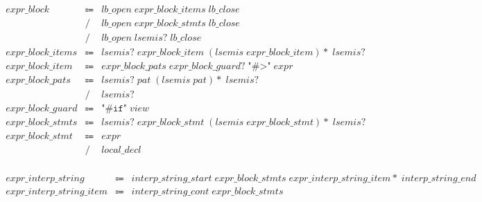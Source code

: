 \begin{align*}
    \begin{array}{rcll}
        \mathit{expr\_block}
        &\Coloneq &\mathit{lb\_open}\; \mathit{expr\_block\_items}\; \mathit{lb\_close} \\
        &\mathrel{/} &\mathit{lb\_open}\; \mathit{expr\_block\_stmts}\; \mathit{lb\_close} \\
        &\mathrel{/} &\mathit{lb\_open}\; \mathit{lsemis}{?}\; \mathit{lb\_close} \\
        \mathit{expr\_block\_items}
        &\Coloneq &\mathit{lsemis}{?}\; \mathit{expr\_block\_item}\; (\mathit{lsemis}\; \mathit{expr\_block\_item}){*}\; \mathit{lsemis}{?} \\
        \mathit{expr\_block\_item}
        &\Coloneq &\mathit{expr\_block\_pats}\; \mathit{expr\_block\_guard}{?}\; \texttt{"\#>"}\; \mathit{expr} \\
        \mathit{expr\_block\_pats}
        &\Coloneq &\mathit{lsemis}{?}\; \mathit{pat}\; (\mathit{lsemis}\; \mathit{pat}){*}\; \mathit{lsemis}{?} \\
        &\mathrel{/} &\mathit{lsemis}{?} \\
        \mathit{expr\_block\_guard}
        &\Coloneq &\texttt{"\#if"}\; \mathit{view} \\
        \mathit{expr\_block\_stmts}
        &\Coloneq &\mathit{lsemis}{?}\; \mathit{expr\_block\_stmt}\; (\mathit{lsemis}\; \mathit{expr\_block\_stmt}){*}\; \mathit{lsemis}{?} \\
        \mathit{expr\_block\_stmt}
        &\Coloneq &\mathit{expr} \\
        &\mathrel{/} &\mathit{local\_decl}
    \end{array}
\end{align*}

\begin{align*}
    \begin{array}{rcll}
        \mathit{expr\_interp\_string}
        &\Coloneq &\mathit{interp\_string\_start}\; \mathit{expr\_block\_stmts}\; \mathit{expr\_interp\_string\_item}{*}\; \mathit{interp\_string\_end} \\
        \mathit{expr\_interp\_string\_item}
        &\Coloneq &\mathit{interp\_string\_cont}\; \mathit{expr\_block\_stmts}
    \end{array}
\end{align*}

